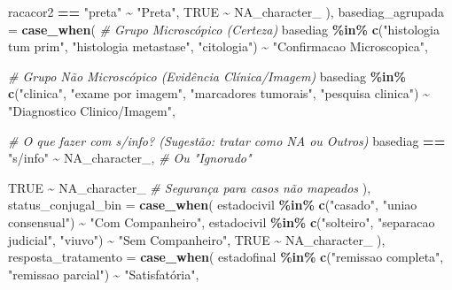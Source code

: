 \documentclass[
]{article}
\newenvironment{Shaded}{\begin{snugshade}}{\end{snugshade}}
\newcommand{\AttributeTok}[1]{\textcolor[rgb]{0.13,0.29,0.53}{#1}}
\newcommand{\CommentTok}[1]{\textcolor[rgb]{0.56,0.35,0.01}{\textit{#1}}}
\newcommand{\ConstantTok}[1]{\textcolor[rgb]{0.56,0.35,0.01}{#1}}
\newcommand{\FunctionTok}[1]{\textcolor[rgb]{0.13,0.29,0.53}{\textbf{#1}}}
\newcommand{\NormalTok}[1]{#1}
\newcommand{\SpecialCharTok}[1]{\textcolor[rgb]{0.81,0.36,0.00}{\textbf{#1}}}
\newcommand{\StringTok}[1]{\textcolor[rgb]{0.31,0.60,0.02}{#1}}
\begin{document}
\begin{Shaded}
\begin{Highlighting}[]
\NormalTok{      racacor2 }\SpecialCharTok{==} \StringTok{"preta"} \SpecialCharTok{\textasciitilde{}} \StringTok{"Preta"}\NormalTok{,}
      \ConstantTok{TRUE} \SpecialCharTok{\textasciitilde{}} \ConstantTok{NA\_character\_}
\NormalTok{    ),}
    \AttributeTok{basediag\_agrupada =} \FunctionTok{case\_when}\NormalTok{(}
      \CommentTok{\# Grupo Microscópico (Certeza)}
\NormalTok{      basediag }\SpecialCharTok{\%in\%} \FunctionTok{c}\NormalTok{(}\StringTok{"histologia tum prim"}\NormalTok{, }
                      \StringTok{"histologia metastase"}\NormalTok{, }
                      \StringTok{"citologia"}\NormalTok{) }\SpecialCharTok{\textasciitilde{}} \StringTok{"Confirmacao Microscopica"}\NormalTok{,}
      
      \CommentTok{\# Grupo Não Microscópico (Evidência Clínica/Imagem)}
\NormalTok{      basediag }\SpecialCharTok{\%in\%} \FunctionTok{c}\NormalTok{(}\StringTok{"clinica"}\NormalTok{, }
                      \StringTok{"exame por imagem"}\NormalTok{, }
                      \StringTok{"marcadores tumorais"}\NormalTok{, }
                      \StringTok{"pesquisa clinica"}\NormalTok{) }\SpecialCharTok{\textasciitilde{}} \StringTok{"Diagnostico Clinico/Imagem"}\NormalTok{,}
      
      \CommentTok{\# O que fazer com s/info? (Sugestão: tratar como NA ou Outros)}
\NormalTok{      basediag }\SpecialCharTok{==} \StringTok{"s/info"} \SpecialCharTok{\textasciitilde{}} \ConstantTok{NA\_character\_}\NormalTok{, }\CommentTok{\# Ou "Ignorado"}
      
      \ConstantTok{TRUE} \SpecialCharTok{\textasciitilde{}} \ConstantTok{NA\_character\_} \CommentTok{\# Segurança para casos não mapeados}
\NormalTok{    ),}
    \AttributeTok{status\_conjugal\_bin =} \FunctionTok{case\_when}\NormalTok{(}
\NormalTok{      estadocivil }\SpecialCharTok{\%in\%} \FunctionTok{c}\NormalTok{(}\StringTok{"casado"}\NormalTok{, }\StringTok{"uniao consensual"}\NormalTok{) }\SpecialCharTok{\textasciitilde{}} \StringTok{"Com Companheiro"}\NormalTok{,}
\NormalTok{      estadocivil }\SpecialCharTok{\%in\%} \FunctionTok{c}\NormalTok{(}\StringTok{"solteiro"}\NormalTok{, }\StringTok{"separacao judicial"}\NormalTok{, }\StringTok{"viuvo"}\NormalTok{) }\SpecialCharTok{\textasciitilde{}} \StringTok{"Sem Companheiro"}\NormalTok{,}
      \ConstantTok{TRUE} \SpecialCharTok{\textasciitilde{}} \ConstantTok{NA\_character\_}
\NormalTok{    ),}
    \AttributeTok{resposta\_tratamento =} \FunctionTok{case\_when}\NormalTok{(}
\NormalTok{      estadofinal }\SpecialCharTok{\%in\%} \FunctionTok{c}\NormalTok{(}\StringTok{"remissao completa"}\NormalTok{, }\StringTok{"remissao parcial"}\NormalTok{) }\SpecialCharTok{\textasciitilde{}} \StringTok{"Satisfatória"}\NormalTok{,}
      

\end{Highlighting}
\end{Shaded}
\end{document}

